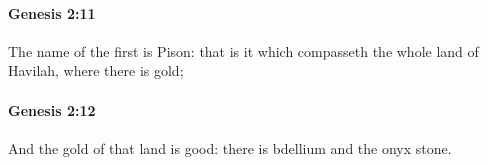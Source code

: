 		\paragraph{Genesis 2:11} %
			\label{GENESIS-2-11}

			The name of the first is Pison: that is it which compasseth the whole land of Havilah, where there is gold;


		\paragraph{Genesis 2:12} %
			\label{GENESIS-2-12}

			And the gold of that land is good: there is bdellium and the onyx stone.



